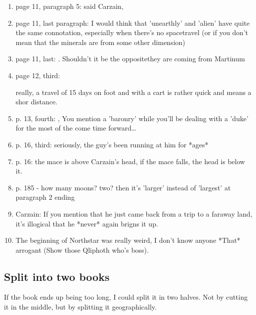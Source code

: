 \begin{enumerate}
  \item 
    page 11, paragraph 5: 
     said Carzain, 
  \item 
    page 11, last paragraph:  I would think that 'unearthly' and 'alien' have quite the same connotation, especially when there's no spacetravel (or if you don't mean that the minerals are from some other dimension)
  \item 
    page 11, last: 
    .  Shouldn't it be the opposite\dash they are coming from Martinum
  \item 
    page 12, third: 
    
    really, a travel of 15 days on foot and with a cart is rather quick and means a shor distance.
  \item 
    p. 13, fourth: , You mention a 'baronry' while you'll be dealing with a 'duke' for the most of the come time forward\ldots{} 
  \item 
    p. 16, third:  seriously, the guy's been running at him for *ages*
  \item 
    p. 16: the mace is above Carzain's head, if the mace falls, the head is below it.
  \item 
    p. 185 - how many moons? two? then it's 'larger' instead of 'largest' at paragraph 2 ending
  \item 
    Carzain: If you mention that he just came back from a trip to a faraway land, it's illogical that he *never* again brigns it up. 
  \item 
    The beginning of Northstar was really weird, I don't know anyone *That* arrogant (Show those Qliphoth who's boss). 
\end{enumerate}










\subsection{Split into two books}
If the book ends up being too long, I could split it in two halves.
Not by cutting it in the middle, but by splitting it geographically.

